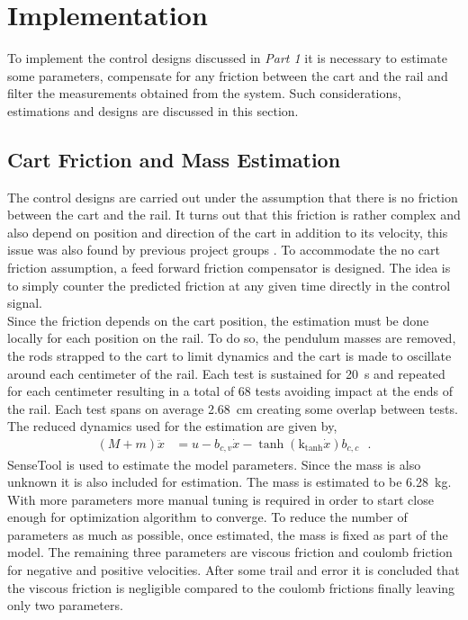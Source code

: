 \chapter{Implementation}
To implement the control designs discussed in \textit{Part 1} it is necessary to estimate some parameters, compensate for any friction between the cart and the rail and filter the measurements obtained from the system. Such considerations, estimations and designs are discussed in this section.

\section{Cart Friction and Mass Estimation}
The control designs are carried out under the assumption that there is no friction between the cart and the rail. It turns out that this friction is rather complex and also depend on position and direction of the cart in addition to its velocity, this issue was also found by previous project groups \cite{JHHorgensen}. To accommodate the no cart friction assumption, a feed forward friction compensator is designed. The idea is to simply counter the predicted friction at any given time directly in the control signal.\\
Since the friction depends on the cart position, the estimation must be done locally for each position on the rail. To do so, the pendulum masses are removed, the rods strapped to the cart to limit dynamics and the cart is made to oscillate around each centimeter of the rail. Each test is sustained for \SI{20}{s} and repeated for each centimeter resulting in a total of 68 tests avoiding impact at the ends of the rail. Each test spans on average \SI{2.68}{cm} creating some overlap between tests. The reduced dynamics used for the estimation are given by,
\begin{align}
  ( M + m )\ddot{x} &=  u - b_{c,v} \dot{x} - \tanh(\text{k}_\text{tanh}\dot{x}) b_{c,c} \ \ \ .
  \label{eq:reducedForCartEstimation}
\end{align}
%
SenseTool is used to estimate the model parameters. Since the mass is also unknown it is also included for estimation. The mass is estimated to be \SI{6.28}{kg}. With more parameters more manual tuning is required in order to start close enough for optimization algorithm to converge. To reduce the number of parameters as much as possible, once estimated, the mass is fixed as part of the model. The remaining three parameters are viscous friction and coulomb friction for negative and positive velocities. After some trail and error it is concluded that the viscous friction is negligible compared to the coulomb frictions finally leaving only two parameters.\\
